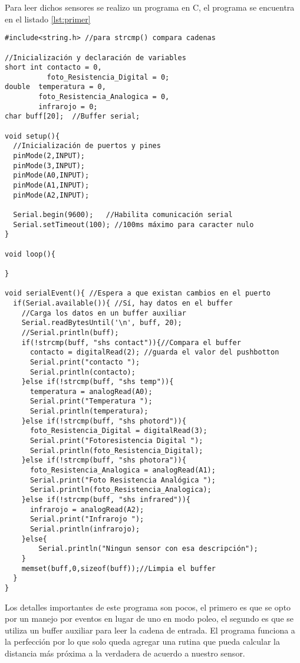 \documentclass[letterpaper]{article}
\begin{document}
Para leer dichos sensores se realizo un programa en C, el programa se 
encuentra en el listado \ref{lst:primer}
\begin{lstlisting}[caption=Programa para sensar, label=lst:primer]
#include<string.h> //para strcmp() compara cadenas

//Inicialización y declaración de variables
short int contacto = 0,
          foto_Resistencia_Digital = 0;
double  temperatura = 0,
        foto_Resistencia_Analogica = 0,
        infrarojo = 0;
char buff[20];	//Buffer serial;

void setup(){
  //Inicialización de puertos y pines
  pinMode(2,INPUT);
  pinMode(3,INPUT);
  pinMode(A0,INPUT);
  pinMode(A1,INPUT);
  pinMode(A2,INPUT);
  
  Serial.begin(9600);   //Habilita comunicación serial
  Serial.setTimeout(100); //100ms máximo para caracter nulo
}

void loop(){

}

void serialEvent(){ //Espera a que existan cambios en el puerto
  if(Serial.available()){ //Sí, hay datos en el buffer
    //Carga los datos en un buffer auxiliar
    Serial.readBytesUntil('\n', buff, 20);
    //Serial.println(buff);
    if(!strcmp(buff, "shs contact")){//Compara el buffer 
      contacto = digitalRead(2); //guarda el valor del pushbotton
      Serial.print("contacto ");
      Serial.println(contacto);
    }else if(!strcmp(buff, "shs temp")){
      temperatura = analogRead(A0);
      Serial.print("Temperatura ");
      Serial.println(temperatura);
    }else if(!strcmp(buff, "shs photord")){
      foto_Resistencia_Digital = digitalRead(3);
      Serial.print("Fotoresistencia Digital ");
      Serial.println(foto_Resistencia_Digital);
    }else if(!strcmp(buff, "shs photora")){
      foto_Resistencia_Analogica = analogRead(A1);
      Serial.print("Foto Resistencia Analógica ");
      Serial.println(foto_Resistencia_Analogica);
    }else if(!strcmp(buff, "shs infrared")){
      infrarojo = analogRead(A2);
      Serial.print("Infrarojo ");
      Serial.println(infrarojo);
    }else{
        Serial.println("Ningun sensor con esa descripción");
    }
    memset(buff,0,sizeof(buff));//Limpia el buffer
  }
}
\end{lstlisting}
Los detalles importantes de este programa son pocos, el primero es que
se opto por un manejo por eventos en lugar de uno en modo poleo, el
segundo es que se utiliza un buffer auxiliar para leer la cadena de 
entrada. El programa funciona a la perfección por lo que solo queda
agregar una rutina que pueda calcular la distancia más próxima a la 
verdadera de acuerdo a nuestro sensor.
\end{document}
